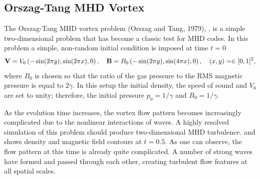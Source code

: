 
\subsection{Orszag-Tang MHD Vortex}
\label{Sec:SimulationOrszagTang}

The Orszag-Tang MHD vortex problem (Orszag and Tang, 1979),
, is a simple
two-dimensional problem that has become a classic test for MHD codes.
In this problem a simple, non-random initial condition is imposed at
time $t=0$
\begin{equation}
  {\bf V} = V_0\left(-\sin(2\pi y),\sin(2\pi x), 0\right),\mbox{~~~}
  {\bf B} = B_0\left(-\sin(2\pi y),\sin(4\pi x), 0\right),\mbox{~~~}
  (x,y)=\in[0,1]^2,
\end{equation}
where $B_0$ is chosen so that the ratio of the gas pressure to the RMS
magnetic pressure is equal to $2\gamma$. In this setup the initial
density, the speed of sound and $V_0$ are set to unity; therefore,
the initial pressure $p_0=1/\gamma$ and $B_0=1/\gamma$.

As the evolution time increases, the vortex flow pattern becomes
increasingly complicated due to the nonlinear interactions of waves.
A highly resolved simulation of this problem should produce
two-dimensional MHD turbulence.  and
 shows density and magnetic field
contours at $t=0.5$. As one can observe, the flow pattern at this
time is already quite complicated. A number of strong waves have
formed and passed through each other, creating turbulent flow
features at all spatial scales.

